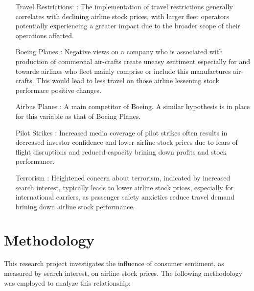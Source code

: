 \documentclass[12pt]{report}
\begin{document}
\begin{enumerate}
    \item[Travel Restrictions:]: The implementation of travel restrictions generally correlates with declining airline stock prices, with larger fleet operators potentially experiencing a greater impact due to the broader scope of their operations affected.
    \item[Boeing Planes]: Negative views on a company who is associated with production of commercial air-crafts create uneasy sentiment especially for and towards airlines who fleet mainly comprise or include this manufactures air-crafts. This would lead to less travel on those airline lessening stock performace positive changes.
    \item[Airbus Planes]: A main competitor of Boeing. A similar hypothesis is in place for this variable as that of Boeing Planes.
    \item[Pilot Strikes]: Increased media coverage of pilot strikes often results in decreased investor confidence and lower airline stock prices due to fears of flight disruptions and reduced capacity brining down profits and stock performance.
    \item[Terrorism]: Heightened concern about terrorism, indicated by increased search interest, typically leads to lower airline stock prices, especially for international carriers, as passenger safety anxieties reduce travel demand brining down airline stock performance.


\end{enumerate}
\nocite{*}


\chapter*{Methodology}



This research project investigates the influence of consumer
sentiment, as measured by search interest, on airline stock prices. The
following methodology was employed to analyze this relationship:
\end{document}

